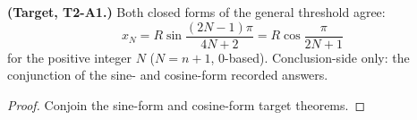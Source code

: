 \begin{theorem}
\label{thm:IPhO2026Problems_problem_IPhO_2026_2_A_1:threshold_x_N}
\textbf{(Target, T2-A1.)}  Both closed forms of the general threshold agree:
\[
x_N = R\sin\!\frac{(2N-1)\pi}{4N+2} = R\cos\!\frac{\pi}{2N+1}
\]
for the positive integer $N$ ($N = n + 1$, $0$-based).  Conclusion-side
only: the conjunction of the sine- and cosine-form recorded answers.
\end{theorem}
\begin{proof}
Conjoin the sine-form and cosine-form target theorems.
\end{proof}
